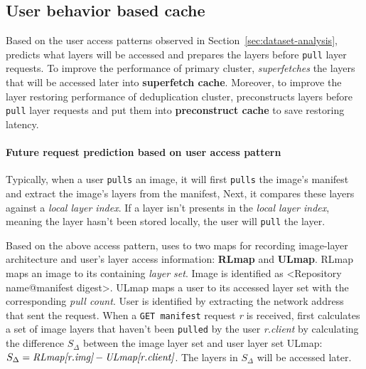
\subsection{User behavior based cache}
\label{sec:cache-design}


%

Based on the user access patterns observed in Section~\ref{sec:dataset-analysis},
\sysname predicts what layers will be accessed and prepares the layers before \texttt{pull} layer requests.
To improve the performance of primary cluster,
\sysname \emph{superfetches} the layers that will be accessed later into \textbf{superfetch cache}.
Moreover, 
to improve the layer restoring performance of deduplication cluster,
\sysname preconstructs layers before \texttt{pull} layer requests 
and put them into \textbf{preconstruct cache} to save restoring latency.

\paragraph{Future request prediction based on user access pattern}
Typically, when a user 
 \texttt{pulls} an image,
it will first \texttt{pulls} the image's manifest and extract the image's layers from the manifest, 
Next, it compares these layers against a \emph{local layer index}.
If a layer isn't presents in the \emph{local layer index}, meaning the layer hasn't been stored locally,
the user will \texttt{pull} the layer.

Based on the above access pattern, 
\sysname uses to two maps for recording image-layer architecture and user's layer access information:
\textbf{RLmap} and \textbf{ULmap}.
 RLmap maps an image to its containing \emph{layer set}.
 Image is identified as \textless Repository name@manifest digest\textgreater.
ULmap maps a user to its accessed layer set with the corresponding \emph{pull count}.
 User is identified by extracting the network address that sent the request. 
 When a \texttt{GET manifest} request \emph{r} is received,
\sysname first calculates a set of image layers that haven't been \texttt{pulled} by the user \emph{r.client} by 
calculating the difference $S_{\Delta}$ between the image layer set and user layer set ULmap:
$ S_{\Delta} = \emph{RLmap[r.img]} - \emph{ULmap[r.client]}$.
The layers in $S_{\Delta}$ will be accessed later.

